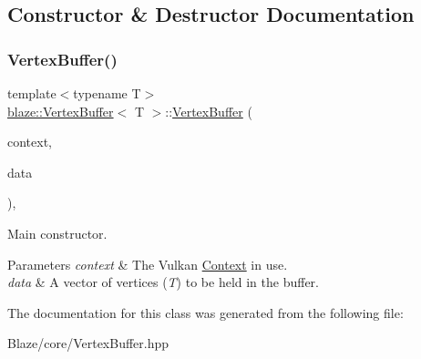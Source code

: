 \subsection{Constructor \& Destructor Documentation}
\mbox{\label{classblaze_1_1VertexBuffer_a21e0c9c1fe434afb5ce5588d1ca7b0f4}} 
\subsubsection{\texorpdfstring{Vertex\+Buffer()}{VertexBuffer()}}
{\footnotesize\ttfamily template$<$typename T$>$ \\
\hyperlink{classblaze_1_1VertexBuffer}{blaze\+::\+Vertex\+Buffer}$<$ T $>$\+::\hyperlink{classblaze_1_1VertexBuffer}{Vertex\+Buffer} (\begin{DoxyParamCaption}\item[{const \hyperlink{classblaze_1_1Context}{Context} \&}]{context,  }\item[{const std\+::vector$<$ T $>$ \&}]{data }\end{DoxyParamCaption})\hspace{0.3cm}{\ttfamily [inline]}, {\ttfamily [noexcept]}}



Main constructor. 


\begin{DoxyParams}{Parameters}
{\em context} & The Vulkan \hyperlink{classblaze_1_1Context}{Context} in use. \\
\hline
{\em data} & A vector of vertices ({\itshape T}) to be held in the buffer. \\
\hline
\end{DoxyParams}


The documentation for this class was generated from the following file\+:\begin{DoxyCompactItemize}
\item 
Blaze/core/Vertex\+Buffer.\+hpp\end{DoxyCompactItemize}
